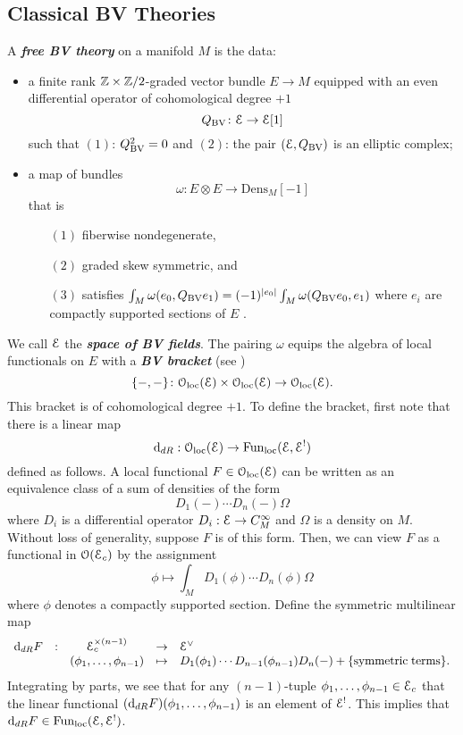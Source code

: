 \documentclass[10pt, oneside]{article}
\newcommand{\Dens}{\mathrm{Dens}}
\newcommand{\defterm}[1]{\textbf{\emph{#1}}}
\begin{document}
\subsection{Classical BV Theories}

\begin{definition}
A \defterm{free BV theory} on a manifold $M$ is the data:
\begin{itemize}
\item a finite rank $\mathbb Z\times\mathbb Z/2$-graded vector bundle $E \to M$ equipped with an even differential operator of cohomological degree $+1$
\[
Q_{\mathrm{BV}} \colon \mathcal E \to \mathcal E [1] 
\]
such that $(1)$: $Q_{\mathrm{BV}}^2 = 0$ and $(2)$: the pair $(\mathcal E , Q_{\mathrm{BV}})$ is an elliptic complex;
\item a map of bundles
\[
\omega\colon E \otimes E \to \Dens_M [-1]
\]
that is
\begin{enumerate}
\item[$(1)$] fiberwise nondegenerate,
\item[$(2)$] graded skew symmetric, and
\item[$(3)$] satisfies $\int_M \omega(e_0, Q_{\mathrm{BV}} e_1) = (-1)^{|e_0|} \int_M \omega(Q_{\mathrm{BV}} e_0, e_1)$ where $e_i$ are compactly supported sections of $E$ .
\end{enumerate}
\end{itemize}
\end{definition}

We call $\mathcal E$ the \defterm{space of BV fields}. The pairing $\omega$ equips the algebra of local functionals on $E$ with a \defterm{BV bracket} (see \cite[Chapter 5.3]{CostelloBook}) 
\[
\{-,-\}\colon \mathcal{O}_{\rm loc}(\mathcal E) \times \mathcal{O}_{\rm loc}(\mathcal E) \to \mathcal{O}_{\rm loc}(\mathcal E) .
\]
This bracket is of cohomological degree $+1$. 
To define the bracket, first note that there is a linear map
\[
{\rm d}_{dR} : \mathcal{O}_{\rm loc}(\mathcal E) \to {\rm Fun}_{\rm loc}(\mathcal E, \mathcal E^!) 
\]
defined as follows. 
A local functional $F \in  \mathcal{O}_{\rm loc}(\mathcal E)$ can be written as an equivalence class of a sum of densities of the form
\[
D_1(-) \cdots D_n(-) \Omega
\]
where $D_i$ is a differential operator $D_i : \mathcal E \to C^\infty_M$ and $\Omega$ is a density on $M$. 
Without loss of generality, suppose $F$ is of this form. 
Then, we can view $F$ as a functional in $\mathcal O(\mathcal E_c)$ by the assignment
\[
\phi \mapsto \int_M D_1(\phi) \cdots D_n(\phi) \Omega
\]
where $\phi$ denotes a compactly supported section. 
Define the symmetric multilinear map
\[
\begin{array}{ccccl}
{\rm d}_{dR} F & : & \mathcal E_c^{\times (n-1)} & \to & \mathcal E^\vee \\
& & (\phi_1, \ldots, \phi_{n-1}) & \mapsto & D_1(\phi_1) \cdots D_{n-1}(\phi_{n-1}) D_{n} (-) + \{{\rm symmetric\;terms}\} .
\end{array}
\]
Integrating by parts, we see that for any $(n-1)$-tuple $\phi_1, \ldots, \phi_{n-1} \in \mathcal E_c$ that the linear functional $({\rm d}_{dR} F) (\phi_1,\ldots, \phi_{n-1})$ is an element of $\mathcal E^!$. 
This implies that ${\rm d}_{dR} F \in {\rm Fun}_{\rm loc}(\mathcal E, \mathcal E^!)$.
\end{document}

